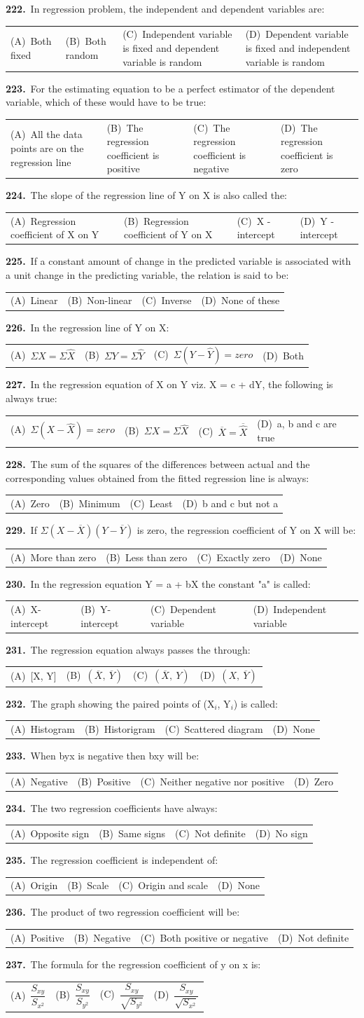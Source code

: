 \documentclass[11pt,a4paper]{article}
\makeatletter
\newcommand{\mcq}[6]{%
  \Needspace{4\baselineskip}%
  \par\medskip\noindent\textbf{#1.}\ #2\par\nopagebreak
  \noindent\begin{tabularx}{\linewidth}{@{\hspace{1.5em}}*{4}{>{\raggedright\arraybackslash}X}@{}}
    (A)~#3 & (B)~#4 & (C)~#5 & (D)~#6
  \end{tabularx}\par}
\makeatother
\begin{document}
\mcq{222}{In regression problem, the independent and dependent variables are:}{Both fixed}{Both random}{Independent variable is fixed and dependent variable is random}{Dependent variable is fixed and independent variable is random}
\mcq{223}{For the estimating equation to be a perfect estimator of the dependent variable, which of these would have to be true:}{All the data points are on the regression line}{The regression coefficient is positive}{The regression coefficient is negative}{The regression coefficient is zero}
\mcq{224}{The slope of the regression line of Y on X is also called the:}{Regression coefficient of X on Y}{Regression coefficient of Y on X}{X - intercept}{Y - intercept}
\mcq{225}{If a constant amount of change in the predicted variable is associated with a unit change in the predicting variable, the relation is said to be:}{Linear}{Non-linear}{Inverse}{None of these}
\mcq{226}{In the regression line of Y on X:}{$\Sigma X=\Sigma\widehat{X}$}{$\Sigma Y=\Sigma\widehat{Y}$}{$\Sigma(Y-\widehat{Y})=zero$}{Both}
\mcq{227}{In the regression equation of X on Y viz. X = c + dY, the following is always true:}{$\Sigma(X-\widehat{X})=zero$}{$\Sigma X=\Sigma\widehat{X}$}{$\overline{X}=\overline{\widehat{X}}$}{a, b and c are true}
\mcq{228}{The sum of the squares of the differences between actual and the corresponding values obtained from the fitted regression line is always:}{Zero}{Minimum}{Least}{b and c but not a}
\mcq{229}{If $\Sigma(X-\overline{X})(Y-\overline{Y})$ is zero, the regression coefficient of Y on X will be:}{More than zero}{Less than zero}{Exactly zero}{None}
\mcq{230}{In the regression equation Y = a + bX the constant "a" is called:}{X-intercept}{Y-intercept}{Dependent variable}{Independent variable}
\mcq{231}{The regression equation always passes the through:}{[X, Y]}{$(\overline{X},\ \overline{Y})$}{$(\overline{X},\ Y)$}{$(X,\ \overline{Y})$}
\mcq{232}{The graph showing the paired points of (X$_{i}$, Y$_{i}$) is called:}{Histogram}{Historigram}{Scattered diagram}{None}
\mcq{233}{When byx is negative then bxy will be:}{Negative}{Positive}{Neither negative nor positive}{Zero}
\mcq{234}{The two regression coefficients have always:}{Opposite sign}{Same signs}{Not definite}{No sign}
\mcq{235}{The regression coefficient is independent of:}{Origin}{Scale}{Origin and scale}{None}
\mcq{236}{The product of two regression coefficient will be:}{Positive}{Negative}{Both positive or negative}{Not definite}
\mcq{237}{The formula for the regression coefficient of y on x is:}{$\dfrac{S_{xy}}{S_{x^{2}}}$}{$\dfrac{S_{xy}}{S_{y^{2}}}$}{$\dfrac{S_{xy}}{\sqrt{S_{y^{2}}}}$}{$\dfrac{S_{xy}}{\sqrt{S_{x^{2}}}}$}
\end{document}
